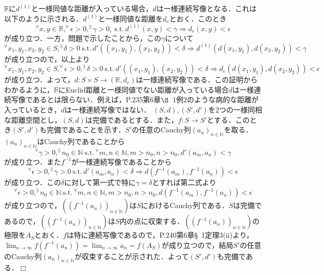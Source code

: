 ﻿\documentclass[11pt,a4paper]{jsarticle}
\newcommand{\st}{\mathrm{s.t.}\,}  %
\def\qed{\hfill $\Box$}
\begin{document}
\supple
$\mathbb{R}$に$d^{(1)}$と一様同値な距離が入っている場合，$d$は一様連続写像となる．これは以下のように示される．$d^{(1)}$と一様同値な距離を$d_{e}$とおく．このとき
\begin{equation*}
^\forall x,y \in \mathbb{R}, ^\forall\epsilon >0, ^\exists\gamma>0,{\ }\st d^{(1)}(x,y)< \gamma \Rightarrow d_{e}(x,y) < \epsilon
\end{equation*}
が成り立つ．一方，問題で示したことから，この$\gamma$について
\begin{equation*}
^\forall x_1,y_1,x_2,y_2 \in S, ^\exists \delta>0 {\ } \st d'((x_1,y_1),(x_2,y_2))<\delta \Rightarrow d^{(1)}(d(x_1,y_1),d(x_2,y_2)) < \gamma
\end{equation*}
が成り立つので，以上より
\begin{equation*}
^\forall x_1,y_1,x_2,y_2 \in S, ^\forall \epsilon>0, ^\exists \delta>0 {\ } \st d'((x_1,y_1),(x_2,y_2))<\delta \Rightarrow d_e(d(x_1,y_1),d(x_2,y_2)) < \epsilon
\end{equation*}
が成り立つ．よって，$d:S \times S \to (\mathbb{R},d_e)$は一様連続写像である．この証明からわかるように，$\mathbb{R}$にEuclid距離と一様同値でない距離が入っている場合$d$は一様連続写像であるとは限らない．例えば，P.235第6章$\S${\ }$1$例$2$のような病的な距離が入っているとき，$d$は一様連続写像ではない．
%
\prob
$(S,d),(S',d')$を$2$つの一様同相な距離空間とし，$(S,d)$は完備であるとする．また，$f:S \to S'$とする．このとき$(S',d')$も完備であることを示す．$S'$の任意のCauchy列$(a_n)_{n \in \mathbb{N}}$を取る．$(a_n)_{n \in \mathbb{N}}$はCauchy列であることから
\begin{equation*}
^\forall \gamma>0, ^\exists n_0 \in \mathbb{N}{\ }\st ^\forall m,n \in \mathbb{N},m>n_0,n>n_0,d'(a_m,a_n)<\gamma
\end{equation*}
が成り立つ．また$f^{-1}$が一様連続写像であることから
\begin{equation*}
^\forall \epsilon>0, ^\exists \gamma>0{\ }\st d'(a_m,a_n)<\delta \Rightarrow d(f^{-1}(a_m),f^{-1}(a_n))<\epsilon
\end{equation*}
が成り立つ．この$\delta$に対して第一式で特に$\gamma=\delta$とすれば第二式より
\begin{equation*}
^\forall \epsilon>0, ^\exists n_0 \in \mathbb{N}{\ }\st ^\forall m,n \in \mathbb{N},m>n_0,n>n_0,d(f^{-1}(a_m),f^{-1}(a_n))<\epsilon
\end{equation*}
が成り立つので，$((f^{-1}(a_n))_{n \in \mathbb{N}})$は$S$におけるCauchy列である．$S$は完備であるので，$((f^{-1}(a_n))_{n \in \mathbb{N}})$は$S$内の点に収束する．$((f^{-1}(a_n))_{n \in \mathbb{N}})$の極限を$A_S$とおく．$f$は特に連続写像であるので，P.240第6章{\S}{\ }1定理3(ii)より，$\displaystyle \lim_{n \to \infty} f(f^{-1}(a_n))=\lim_{n \to \infty} a_n=f(A_S)$が成り立つので，結局$S'$の任意のCauchy列$(a_n)_{n \in \mathbb{N}}$が収束することが示された．よって$(S',d')$も完備である．\qed
\end{document}
